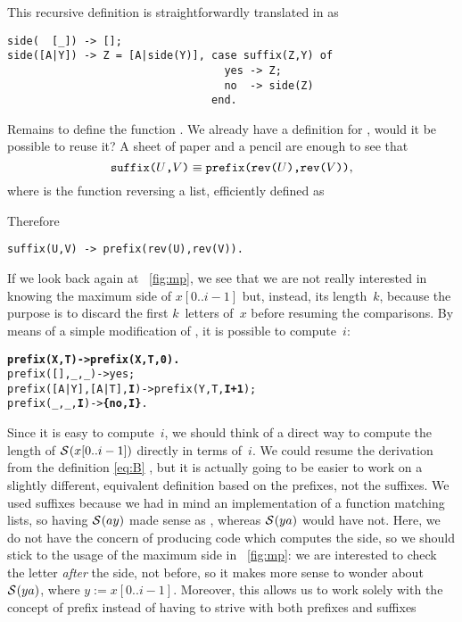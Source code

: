 \noindent This recursive definition is straightforwardly translated in
\Erlang as
\begin{verbatim}
side(  [_]) -> [];
side([A|Y]) -> Z = [A|side(Y)], case suffix(Z,Y) of
                                  yes -> Z;
                                  no  -> side(Z)
                                end.
\end{verbatim}
Remains to define the function . We already have a
definition for , would it be possible to reuse it? A
sheet of paper and a pencil are enough to see that
\[
\texttt{suffix(\(U\),\(V\))}
\mathrel{\equiv}
\texttt{prefix(rev(\(U\)),rev(\(V\)))},
\]
where  is the function reversing a list, efficiently
defined as

Therefore
\begin{verbatim}
suffix(U,V) -> prefix(rev(U),rev(V)).
\end{verbatim}
If we look back again at \fig~\vref{fig:mp}, we see that we are not
really interested in knowing the maximum side of \(x[0..i-1]\) but,
instead, its length~\(k\), because the purpose is to discard the first
\(k\)~letters of~\(x\) before resuming the comparisons. By means of a
simple modification of , it is possible to
compute~\(i\):
\begin{alltt}
\textbf{prefix(X,T)           -> prefix(X,T,0).}
prefix(   [],    _,_) -> yes;\hfill% \(i\) \emph{useless if match}
prefix([A|Y],[A|T],\textbf{I}) -> prefix(Y,T,\textbf{I+1});
prefix(    _,    _,\textbf{I}) -> \textbf{\{no,I\}}.\hfill% I \emph{is} \(i\)
\end{alltt}
Since it is easy to compute~\(i\), we should think of a direct way to
compute the length of \(\mathcal{S}^{}(x[0..i-1])\) directly in terms
of~\(i\). We could resume the derivation from the definition
\eqref{eq:B} , but it is actually going to be easier to
work on a slightly different, equivalent definition based on the
prefixes, not the suffixes. We used suffixes because we had in mind an
implementation of a function matching lists, so having
\(\mathcal{S}^{}(ay)\) made sense as , whereas
\(\mathcal{S}^{}(ya)\) would have not. Here, we do not have the concern of
producing \Erlang code which computes the side, so we should stick to
the usage of the maximum side in \fig~\vref{fig:mp}: we are interested
to check the letter \emph{after} the side, not before, so it makes
more sense to wonder about \(\mathcal{S}^{}(ya)\), where \(y :=
x[0..i-1]\). Moreover, this allows us to work solely with the concept
of prefix instead of having to strive with both prefixes and suffixes
